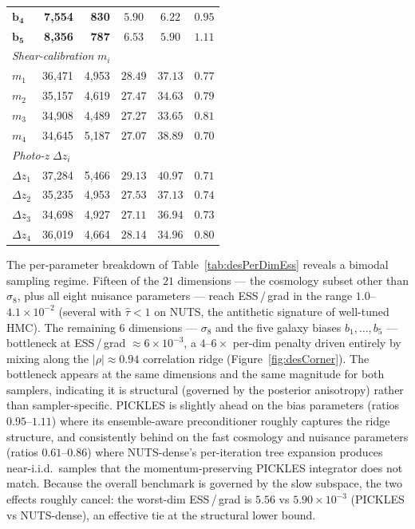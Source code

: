 \documentclass{article}
\begin{document}
\begin{table}[t]
\begin{tabular}{l rr cc c}
$\boldsymbol{b_4}$ & \textbf{7{,}554} & \textbf{830} & $\mathbf{5.90}$ & $\mathbf{6.22}$ & $0.95$ \\
$\boldsymbol{b_5}$ & \textbf{8{,}356} & \textbf{787} & $\mathbf{6.53}$ & $\mathbf{5.90}$ & $1.11$ \\
\midrule
\multicolumn{6}{l}{\emph{Shear-calibration} $m_i$} \\
$m_1$ & 36{,}471 & 4{,}953 & $28.49$ & $37.13$ & $0.77$ \\
$m_2$ & 35{,}157 & 4{,}619 & $27.47$ & $34.63$ & $0.79$ \\
$m_3$ & 34{,}908 & 4{,}489 & $27.27$ & $33.65$ & $0.81$ \\
$m_4$ & 34{,}645 & 5{,}187 & $27.07$ & $38.89$ & $0.70$ \\
\midrule
\multicolumn{6}{l}{\emph{Photo-z} $\Delta z_i$} \\
$\Delta z_1$ & 37{,}284 & 5{,}466 & $29.13$ & $40.97$ & $0.71$ \\
$\Delta z_2$ & 35{,}235 & 4{,}953 & $27.53$ & $37.13$ & $0.74$ \\
$\Delta z_3$ & 34{,}698 & 4{,}927 & $27.11$ & $36.94$ & $0.73$ \\
$\Delta z_4$ & 36{,}019 & 4{,}664 & $28.14$ & $34.96$ & $0.80$ \\
\bottomrule
\end{tabular}
\end{table}

The per-parameter breakdown of Table~\ref{tab:desPerDimEss} reveals a
bimodal sampling regime.  Fifteen of the $21$ dimensions --- the
cosmology subset other than $\sigma_8$, plus all eight nuisance
parameters --- reach ESS\,/\,grad in the range $1.0$--$4.1\times 10^{-2}$
(several with $\hat\tau<1$ on NUTS, the antithetic signature of well-tuned
HMC).  The remaining $6$ dimensions --- $\sigma_8$ and the five galaxy
biases $b_1\!,\!\dots\!,\!b_5$ --- bottleneck at ESS\,/\,grad
$\approx 6\!\times\!10^{-3}$, a $4$--$6\times$ per-dim penalty driven
entirely by mixing along the $|\rho| \approx 0.94$ correlation ridge
(Figure~\ref{fig:desCorner}).  The bottleneck appears at the same
dimensions and the same magnitude for both samplers, indicating
it is structural (governed by the posterior anisotropy) rather than
sampler-specific.  PICKLES is slightly ahead on the bias parameters
(ratios $0.95$--$1.11$) where its ensemble-aware preconditioner roughly
captures the ridge structure, and consistently behind on the fast
cosmology and nuisance parameters (ratios $0.61$--$0.86$) where
NUTS-dense's per-iteration tree expansion produces near-i.i.d.\ samples
that the momentum-preserving PICKLES integrator does not match.
Because the overall benchmark is governed by the slow subspace, the
two effects roughly cancel: the worst-dim ESS\,/\,grad is $5.56$ vs
$5.90 \times 10^{-3}$ (PICKLES vs NUTS-dense), an effective tie at
the structural lower bound.
\end{document}
